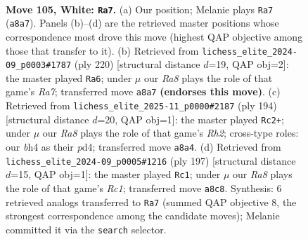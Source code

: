 \documentclass[11pt]{article}
\begin{document}
\begin{figure}[p]\centering
\begin{subfigure}{0.46\textwidth}\centering
\resizebox{\linewidth}{!}{%
\newchessgame
\chessboard[
  setfen={R7/7n/6rp/4p3/6kb/1K1p4/8/8 w - - 6 105},
  showmover=false,
  pgfstyle=straightmove, color=movearrow, markmove={a8-a7}
]}
\caption{}
\end{subfigure}\hfill
\begin{subfigure}{0.46\textwidth}\centering
\resizebox{\linewidth}{!}{%
\newchessgame
\chessboard[
  setfen={8/R7/8/5pr1/8/5pk1/8/5K2 w - - 78 111},
  showmover=false,
  pgfstyle=straightmove, color=movearrow, markmove={a7-a6}
]}
\caption{}
\end{subfigure}
\\[4pt]
\begin{subfigure}{0.46\textwidth}\centering
\resizebox{\linewidth}{!}{%
\newchessgame
\chessboard[
  setfen={8/8/8/1p6/3p4/2k3r1/7R/2K5 w - - 4 98},
  showmover=false,
  pgfstyle=straightmove, color=movearrow, markmove={h2-c2}
]}
\caption{}
\end{subfigure}\hfill
\begin{subfigure}{0.46\textwidth}\centering
\resizebox{\linewidth}{!}{%
\newchessgame
\chessboard[
  setfen={2r5/4k3/1R4P1/4K2p/4B2P/8/8/8 b - - 2 99},
  showmover=false,
  pgfstyle=straightmove, color=movearrow, markmove={c8-c1}
]}
\caption{}
\end{subfigure}
\caption{\textbf{Move 105, White: \texttt{Ra7}.} (a) Our position; Melanie plays \texttt{Ra7} (\texttt{a8a7}). Panels (b)--(d) are the retrieved master positions whose correspondence most drove this move (highest QAP objective among those that transfer to it). (b) Retrieved from \texttt{lichess\_elite\_2024-09\_p0003\#1787} (ply 220) [structural distance $d$=19, QAP obj=2]: the master played \texttt{Ra6}; under $\mu$ our \emph{Ra8} plays the role of that game's \emph{Ra7}; transferred move \texttt{a8a7} \textbf{(endorses this move)}. (c) Retrieved from \texttt{lichess\_elite\_2025-11\_p0000\#2187} (ply 194) [structural distance $d$=20, QAP obj=1]: the master played \texttt{Rc2+}; under $\mu$ our \emph{Ra8} plays the role of that game's \emph{Rh2}; cross-type roles: our \emph{b}h4 as their \emph{p}d4; transferred move \texttt{a8a4}. (d) Retrieved from \texttt{lichess\_elite\_2024-09\_p0005\#1216} (ply 197) [structural distance $d$=15, QAP obj=1]: the master played \texttt{Rc1}; under $\mu$ our \emph{Ra8} plays the role of that game's \emph{Rc1}; transferred move \texttt{a8c8}. Synthesis: 6 retrieved analogs transferred to \texttt{Ra7} (summed QAP objective 8, the strongest correspondence among the candidate moves); Melanie committed it via the \texttt{search} selector.}
\label{fig:thought-m208}
\end{figure}
\end{document}
